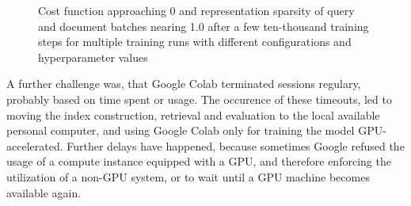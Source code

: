 \begin{figure}[htbp]
\centering
\begin{subfigure}[b]{0.96\textwidth}
    \centering
    \label{fig:2020-01-15:cost-fn}
\end{subfigure}
\begin{subfigure}[b]{0.45\textwidth}
    \centering
    \label{fig:2020-01-15:sparsity-query-repr}
\end{subfigure}
\hspace{0.042\textwidth}
\begin{subfigure}[b]{0.45\textwidth}
    \centering
    \label{fig:2020-01-15:sparsity-doc-repr}
\end{subfigure}
\caption[Costs function and course of representation sparsity for runs with different configurations and hyperparameters]{Cost function approaching 0 and representation sparsity of query and document batches nearing 1.0 after a few ten-thousand training steps for multiple training runs with different configurations and hyperparameter values}
\label{fig:2020-01-15:cost-fn-query-doc-repr-sparsity} %
\end{figure}

A further challenge was, that Google Colab terminated sessions regulary, probably based on time spent or usage.
The occurence of these timeouts, led to moving the index construction, retrieval and evaluation to the 
    local available personal computer, and using Google Colab only for training the model GPU-accelerated.
Further delays have happened, because sometimes Google refused the usage of a compute instance equipped with a GPU,
    and therefore enforcing the utilization of a non-GPU system, 
    or to wait until a GPU machine becomes available again.

